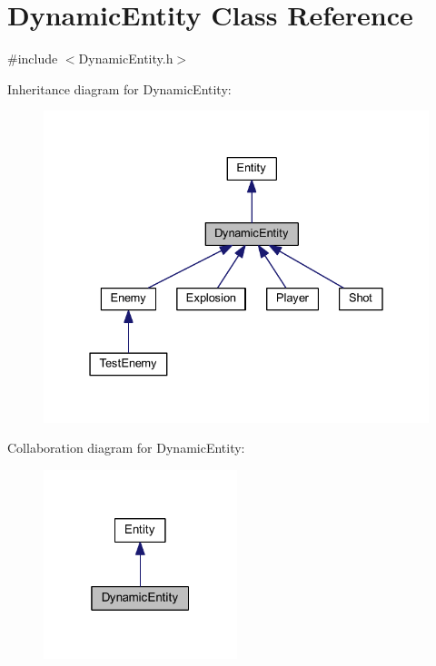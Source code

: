 \hypertarget{class_dynamic_entity}{
\section{DynamicEntity Class Reference}
\label{d6/da4/class_dynamic_entity}
}


{\ttfamily \#include $<$DynamicEntity.h$>$}



Inheritance diagram for DynamicEntity:
\nopagebreak
\begin{figure}[H]
\begin{center}
\leavevmode
\includegraphics[width=331pt]{d3/de5/class_dynamic_entity__inherit__graph}
\end{center}
\end{figure}


Collaboration diagram for DynamicEntity:
\nopagebreak
\begin{figure}[H]
\begin{center}
\leavevmode
\includegraphics[width=160pt]{d3/ddd/class_dynamic_entity__coll__graph}
\end{center}
\end{figure}
